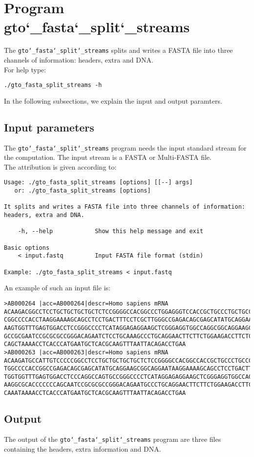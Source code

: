 \section{Program gto\char`_fasta\char`_split\char`_streams}
The \texttt{gto\char`_fasta\char`_split\char`_streams} splits and writes a FASTA file into three channels of information: headers, extra and DNA.\\
For help type:
\begin{lstlisting}
./gto_fasta_split_streams -h
\end{lstlisting}
In the following subsections, we explain the input and output paramters.

\subsection*{Input parameters}

The \texttt{gto\char`_fasta\char`_split\char`_streams} program needs the input standard stream for the computation. The input stream is a FASTA or Multi-FASTA file.\\
The attribution is given according to:
\begin{lstlisting}
Usage: ./gto_fasta_split_streams [options] [[--] args]
   or: ./gto_fasta_split_streams [options]

It splits and writes a FASTA file into three channels of information: headers, extra and DNA.

    -h, --help            Show this help message and exit

Basic options
    < input.fastq         Input FASTA file format (stdin)

Example: ./gto_fasta_split_streams < input.fastq
\end{lstlisting}
An example of such an input file is:
\begin{lstlisting}
>AB000264 |acc=AB000264|descr=Homo sapiens mRNA 
ACAAGACGGCCTCCTGCTGCTGCTGCTCTCCGGGGCCACGGCCCTGGAGGGTCCACCGCTGCCCTGCTGCCATTGTCCC
CGGCCCCACCTAAGGAAAAGCAGCCTCCTGACTTTCCTCGCTTGGGCCGAGACAGCGAGCATATGCAGGAAGCGGCAGG
AAGTGGTTTGAGTGGACCTCCGGGCCCCTCATAGGAGAGGAAGCTCGGGAGGTGGCCAGGCGGCAGGAAGCAGGCCAGT
GCCGCGAATCCGCGCGCCGGGACAGAATCTCCTGCAAAGCCCTGCAGGAACTTCTTCTGGAAGACCTTCTCCACCCCCC
CAGCTAAAACCTCACCCATGAATGCTCACGCAAGTTTAATTACAGACCTGAA
>AB000263 |acc=AB000263|descr=Homo sapiens mRNA 
ACAAGATGCCATTGTCCCCCGGCCTCCTGCTGCTGCTGCTCTCCGGGGCCACGGCCACCGCTGCCCTGCCCCTGGAGGG
TGGCCCCACCGGCCGAGACAGCGAGCATATGCAGGAAGCGGCAGGAATAAGGAAAAGCAGCCTCCTGACTTTCCTCGCT
TGGTGGTTTGAGTGGACCTCCCAGGCCAGTGCCGGGCCCCTCATAGGAGAGGAAGCTCGGGAGGTGGCCAGGCGGCAGG
AAGGCGCACCCCCCCAGCAATCCGCGCGCCGGGACAGAATGCCCTGCAGGAACTTCTTCTGGAAGACCTTCTCCTCCTG
CAAATAAAACCTCACCCATGAATGCTCACGCAAGTTTAATTACAGACCTGAA
\end{lstlisting}

\subsection*{Output}

The output of the \texttt{gto\char`_fasta\char`_split\char`_streams} program are three files containing the headers, extra information and DNA.
